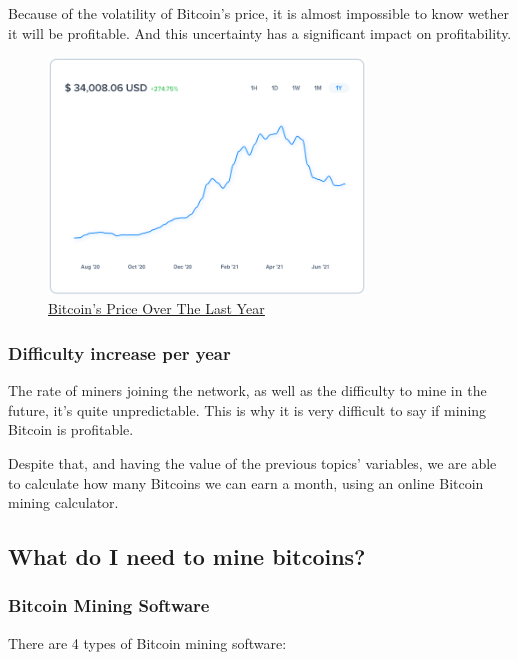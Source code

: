 \documentclass{article}
\newcommand\tab[1][1cm]{\hspace*{#1}}
\begin{document}
\tab Because of the volatility of Bitcoin's price, it is almost impossible to know wether it will be profitable. And this uncertainty has a significant impact on profitability.

\begin{figure}[H]
    \begin{center}
        \includegraphics[width=0.75\textwidth]{images/bitcoin_price.png}
        \caption{\href{https://uphold.com/en/prices/crypto/bitcoin-price}{\underline{Bitcoin's Price Over The Last Year}}}
    \end{center}
\end{figure}

\subsubsection{Difficulty increase per year}

\tab The rate of miners joining the network, as well as the difficulty to mine in the future, it's quite unpredictable. This is why it is very difficult to say if mining Bitcoin is profitable.

Despite that, and having the value of the previous topics' variables, we are able to calculate how many Bitcoins we can earn a month, using an online Bitcoin mining calculator.

\subsection{What do I need to mine bitcoins?}

\subsubsection{Bitcoin Mining Software}

There are 4 types of Bitcoin mining software:
\end{document}
